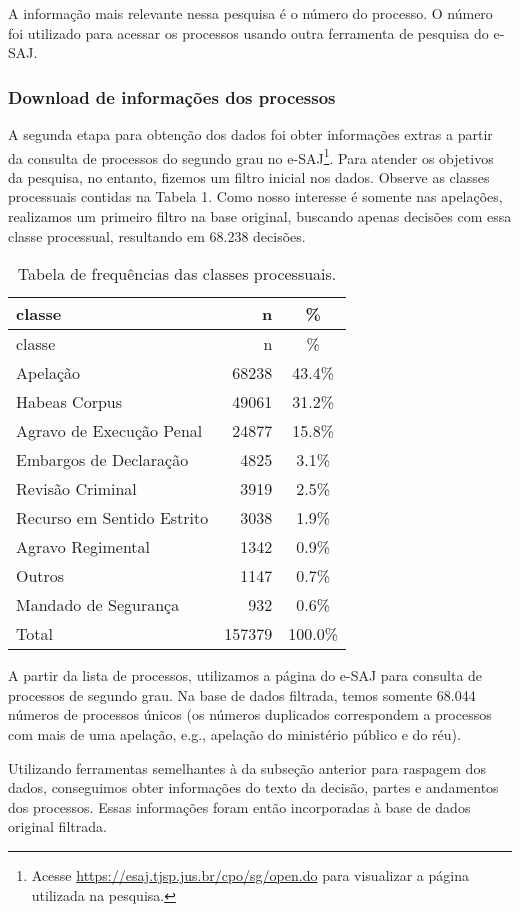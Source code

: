 \documentclass[10pt,]{article}
\let\rmarkdownfootnote\footnote%
\def\footnote{\protect\rmarkdownfootnote}
\begin{document}
A informação mais relevante nessa pesquisa é o número do processo. O
número foi utilizado para acessar os processos usando outra ferramenta
de pesquisa do e-SAJ.

\subsubsection{Download de informações dos
processos}\label{download-de-informacoes-dos-processos}

A segunda etapa para obtenção dos dados foi obter informações extras a
partir da consulta de processos do segundo grau no e-SAJ\footnote{Acesse
  \href{https://esaj.tjsp.jus.br/cpo/sg/open.do}{\url{https://esaj.tjsp.jus.br/cpo/sg/open.do}}
  para visualizar a página utilizada na pesquisa.}. Para atender os
objetivos da pesquisa, no entanto, fizemos um filtro inicial nos dados.
Observe as classes processuais contidas na Tabela 1. Como nosso
interesse é somente nas apelações, realizamos um primeiro filtro na base
original, buscando apenas decisões com essa classe processual,
resultando em 68.238 decisões.

\begin{longtable}[c]{@{}lrc@{}}
\caption{Tabela de frequências das classes processuais.}\tabularnewline
\toprule
classe & n & \%\tabularnewline
\midrule
\endfirsthead
\toprule
classe & n & \%\tabularnewline
\midrule
\endhead
Apelação & 68238 & 43.4\%\tabularnewline
Habeas Corpus & 49061 & 31.2\%\tabularnewline
Agravo de Execução Penal & 24877 & 15.8\%\tabularnewline
Embargos de Declaração & 4825 & 3.1\%\tabularnewline
Revisão Criminal & 3919 & 2.5\%\tabularnewline
Recurso em Sentido Estrito & 3038 & 1.9\%\tabularnewline
Agravo Regimental & 1342 & 0.9\%\tabularnewline
Outros & 1147 & 0.7\%\tabularnewline
Mandado de Segurança & 932 & 0.6\%\tabularnewline
Total & 157379 & 100.0\%\tabularnewline
\bottomrule
\end{longtable}

A partir da lista de processos, utilizamos a página do e-SAJ para
consulta de processos de segundo grau. Na base de dados filtrada, temos
somente 68.044 números de processos únicos (os números duplicados
correspondem a processos com mais de uma apelação, e.g., apelação do
ministério público e do réu).

Utilizando ferramentas semelhantes à da subseção anterior para raspagem
dos dados, conseguimos obter informações do texto da decisão, partes e
andamentos dos processos. Essas informações foram então incorporadas à
base de dados original filtrada.
\end{document}
